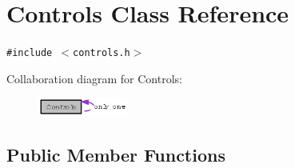\section{Controls Class Reference}
\label{classControls}
{\tt \#include $<$controls.h$>$}

Collaboration diagram for Controls:\begin{figure}[H]
\begin{center}
\leavevmode
\includegraphics[width=83pt]{classControls__coll__graph}
\end{center}
\end{figure}
\subsection*{Public Member Functions}

